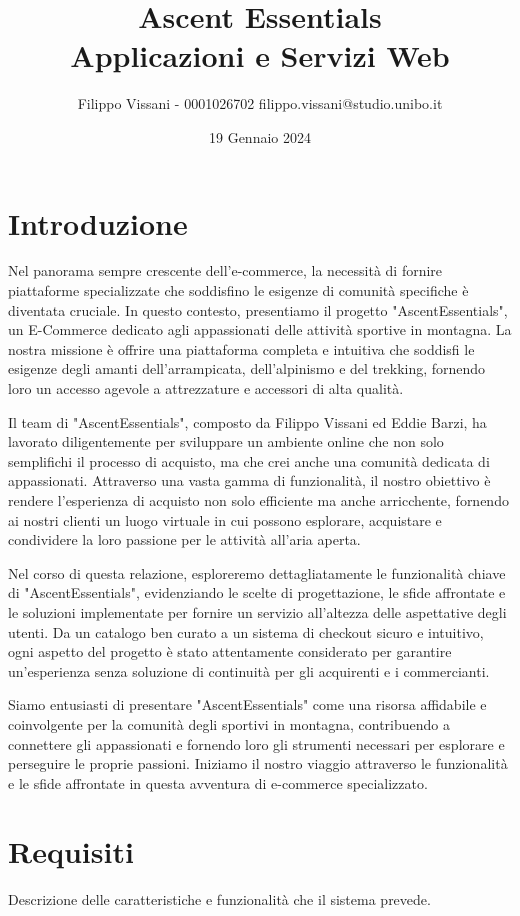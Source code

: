 \documentclass[12pt,a4paper,openright,twoside]{book}
\title{
    Ascent Essentials \\
    \large Applicazioni e Servizi Web
}
\author{Filippo Vissani - 0001026702 filippo.vissani@studio.unibo.it}
\date{19 Gennaio 2024}
\begin{document}
\maketitle
\chapter{Introduzione}
Nel panorama sempre crescente dell'e-commerce, la necessità di fornire piattaforme specializzate che soddisfino le esigenze di comunità specifiche è diventata cruciale. In questo contesto, presentiamo il progetto "AscentEssentials", un E-Commerce dedicato agli appassionati delle attività sportive in montagna. La nostra missione è offrire una piattaforma completa e intuitiva che soddisfi le esigenze degli amanti dell'arrampicata, dell'alpinismo e del trekking, fornendo loro un accesso agevole a attrezzature e accessori di alta qualità.

Il team di "AscentEssentials", composto da Filippo Vissani ed Eddie Barzi, ha lavorato diligentemente per sviluppare un ambiente online che non solo semplifichi il processo di acquisto, ma che crei anche una comunità dedicata di appassionati. Attraverso una vasta gamma di funzionalità, il nostro obiettivo è rendere l'esperienza di acquisto non solo efficiente ma anche arricchente, fornendo ai nostri clienti un luogo virtuale in cui possono esplorare, acquistare e condividere la loro passione per le attività all'aria aperta.

Nel corso di questa relazione, esploreremo dettagliatamente le funzionalità chiave di "AscentEssentials", evidenziando le scelte di progettazione, le sfide affrontate e le soluzioni implementate per fornire un servizio all'altezza delle aspettative degli utenti. Da un catalogo ben curato a un sistema di checkout sicuro e intuitivo, ogni aspetto del progetto è stato attentamente considerato per garantire un'esperienza senza soluzione di continuità per gli acquirenti e i commercianti.

Siamo entusiasti di presentare "AscentEssentials" come una risorsa affidabile e coinvolgente per la comunità degli sportivi in montagna, contribuendo a connettere gli appassionati e fornendo loro gli strumenti necessari per esplorare e perseguire le proprie passioni. Iniziamo il nostro viaggio attraverso le funzionalità e le sfide affrontate in questa avventura di e-commerce specializzato.

\chapter{Requisiti}
Descrizione delle caratteristiche e funzionalità che il sistema prevede. 
\end{document}
